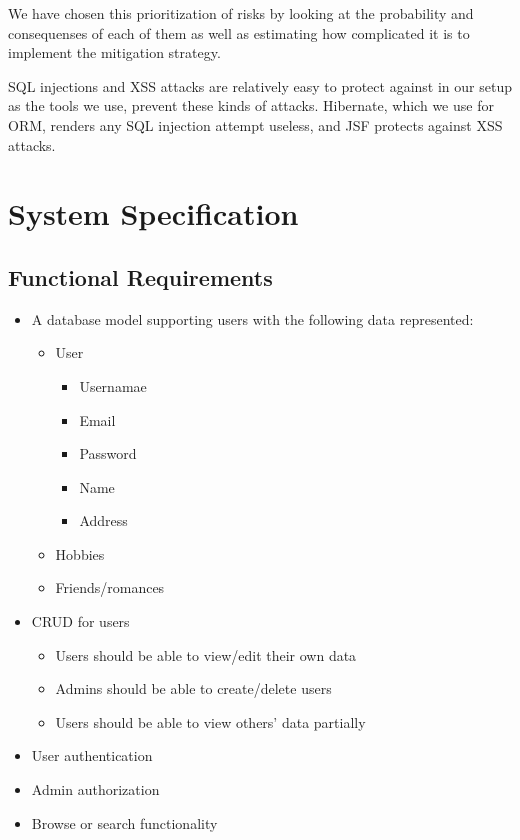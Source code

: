 \documentclass[a4paper]{article}
\begin{document}
We have chosen this prioritization of risks by looking at the probability and consequenses of each of them as well as estimating how complicated it is to implement the mitigation strategy.

SQL injections and XSS attacks are relatively easy to protect against in our setup as the tools we use, prevent these kinds of attacks. Hibernate, which we use for ORM, renders any SQL injection attempt useless, and JSF protects against XSS attacks.


\section{System Specification}

\subsection{Functional Requirements}
\begin{itemize}
\item A database model supporting users with the following data represented:
  \begin{itemize}
  \item User
      \begin{itemize}
      \item Usernamae
      \item Email
      \item Password
      \item Name
      \item Address
      \end{itemize}
  \item Hobbies
  \item Friends/romances
  \end{itemize}
\item CRUD for users
	\begin{itemize}
    \item Users should be able to view/edit their own data
    \item Admins should be able to create/delete users
    \item Users should be able to view others' data partially
    \end{itemize}
\item User authentication
\item Admin authorization
\item Browse or search functionality
\end{itemize}
\end{document}
